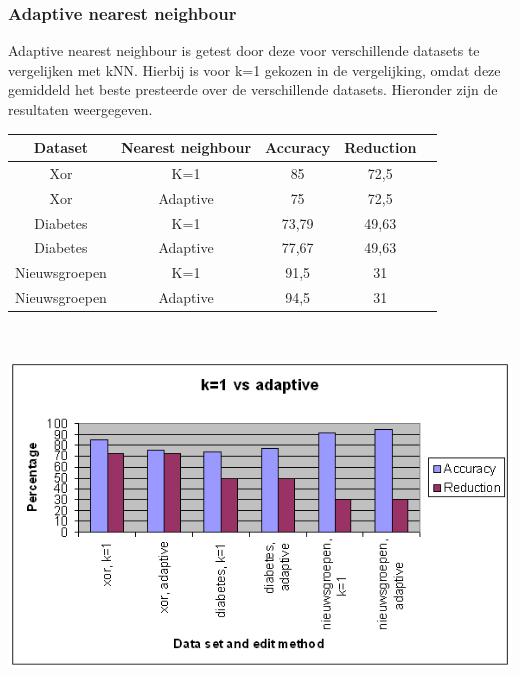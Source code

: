 \documentclass{article}
\begin{document}
\subsubsection{Adaptive nearest neighbour}
Adaptive nearest neighbour is getest door deze voor verschillende datasets te vergelijken met kNN. Hierbij is voor k=1 gekozen in de vergelijking, omdat deze gemiddeld het beste presteerde over de verschillende datasets. Hieronder zijn de resultaten weergegeven.\\


\begin{tabular}{|c|c|c|c|c|}  \hline	
Dataset & Nearest neighbour & Accuracy &	Reduction \\ \hline
Xor & K=1	& 85 &	72,5 \\
Xor & Adaptive &	75 &	72,5 \\
Diabetes & K=1 &	73,79 &	49,63 \\
Diabetes & Adaptive & 	77,67 &	49,63 \\
Nieuwsgroepen & K=1 &	91,5 &	31 \\
Nieuwsgroepen & Adaptive &	94,5 &	31 \\ \hline
\end{tabular} \\

\begin{center} \includegraphics[scale=0.7]{GG_k1_vs_adaptive} \end{center}
\end{document}
